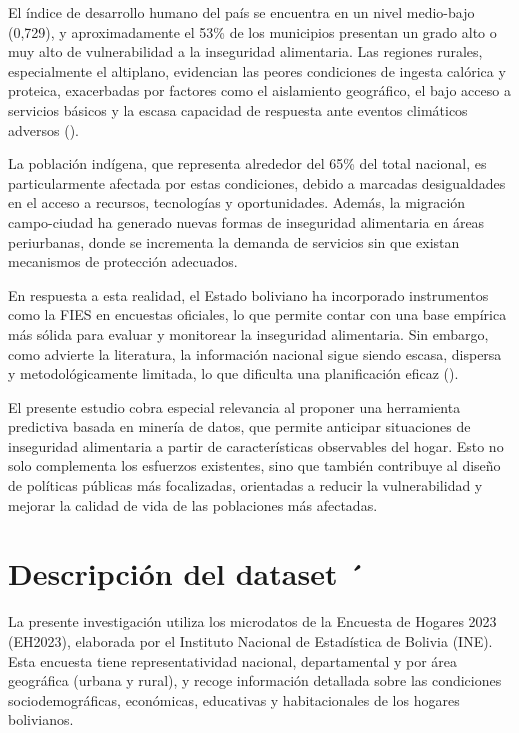 \documentclass[Royal,times,sageh]{sagej}
\begin{document}
El índice de desarrollo humano del país se encuentra en un nivel
medio-bajo (0,729), y aproximadamente el 53\% de los municipios
presentan un grado alto o muy alto de vulnerabilidad a la inseguridad
alimentaria. Las regiones rurales, especialmente el altiplano,
evidencian las peores condiciones de ingesta calórica y proteica,
exacerbadas por factores como el aislamiento geográfico, el bajo acceso
a servicios básicos y la escasa capacidad de respuesta ante eventos
climáticos adversos (\citet{mallea2014}).

La población indígena, que representa alrededor del 65\% del total
nacional, es particularmente afectada por estas condiciones, debido a
marcadas desigualdades en el acceso a recursos, tecnologías y
oportunidades. Además, la migración campo-ciudad ha generado nuevas
formas de inseguridad alimentaria en áreas periurbanas, donde se
incrementa la demanda de servicios sin que existan mecanismos de
protección adecuados.

En respuesta a esta realidad, el Estado boliviano ha incorporado
instrumentos como la FIES en encuestas oficiales, lo que permite contar
con una base empírica más sólida para evaluar y monitorear la
inseguridad alimentaria. Sin embargo, como advierte la literatura, la
información nacional sigue siendo escasa, dispersa y metodológicamente
limitada, lo que dificulta una planificación eficaz
(\citet{mallea2014}).

El presente estudio cobra especial relevancia al proponer una
herramienta predictiva basada en minería de datos, que permite anticipar
situaciones de inseguridad alimentaria a partir de características
observables del hogar. Esto no solo complementa los esfuerzos
existentes, sino que también contribuye al diseño de políticas públicas
más focalizadas, orientadas a reducir la vulnerabilidad y mejorar la
calidad de vida de las poblaciones más afectadas.

\section{Descripción del dataset ´}\label{descripciuxf3n-del-dataset}

La presente investigación utiliza los microdatos de la Encuesta de
Hogares 2023 (EH2023), elaborada por el Instituto Nacional de
Estadística de Bolivia (INE). Esta encuesta tiene representatividad
nacional, departamental y por área geográfica (urbana y rural), y recoge
información detallada sobre las condiciones sociodemográficas,
económicas, educativas y habitacionales de los hogares bolivianos.
\end{document}
